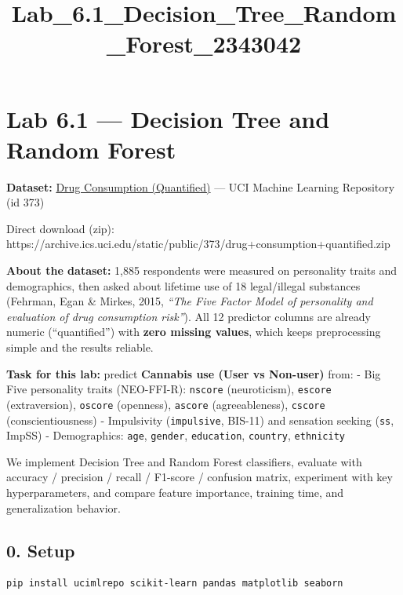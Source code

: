 \documentclass[11pt]{article}
\title{Lab\_6.1\_Decision\_Tree\_Random\_Forest\_2343042}
\begin{document}
    
    \maketitle
    
    

    
    \section{Lab 6.1 --- Decision Tree and Random
Forest}\label{lab-6.1-decision-tree-and-random-forest}

\textbf{Dataset:}
\href{https://archive.ics.uci.edu/dataset/373/drug+consumption+quantified}{Drug
Consumption (Quantified)} --- UCI Machine Learning Repository (id 373)

Direct download (zip):
https://archive.ics.uci.edu/static/public/373/drug+consumption+quantified.zip

\textbf{About the dataset:} 1,885 respondents were measured on
personality traits and demographics, then asked about lifetime use of 18
legal/illegal substances (Fehrman, Egan \& Mirkes, 2015, \emph{``The
Five Factor Model of personality and evaluation of drug consumption
risk''}). All 12 predictor columns are already numeric (``quantified'')
with \textbf{zero missing values}, which keeps preprocessing simple and
the results reliable.

\textbf{Task for this lab:} predict \textbf{Cannabis use (User vs
Non-user)} from: - Big Five personality traits (NEO-FFI-R):
\texttt{nscore} (neuroticism), \texttt{escore} (extraversion),
\texttt{oscore} (openness), \texttt{ascore} (agreeableness),
\texttt{cscore} (conscientiousness) - Impulsivity (\texttt{impulsive},
BIS-11) and sensation seeking (\texttt{ss}, ImpSS) - Demographics:
\texttt{age}, \texttt{gender}, \texttt{education}, \texttt{country},
\texttt{ethnicity}

We implement Decision Tree and Random Forest classifiers, evaluate with
accuracy / precision / recall / F1-score / confusion matrix, experiment
with key hyperparameters, and compare feature importance, training time,
and generalization behavior.

    \subsection{0. Setup}\label{setup}

\begin{verbatim}
pip install ucimlrepo scikit-learn pandas matplotlib seaborn
\end{verbatim}
\end{document}
